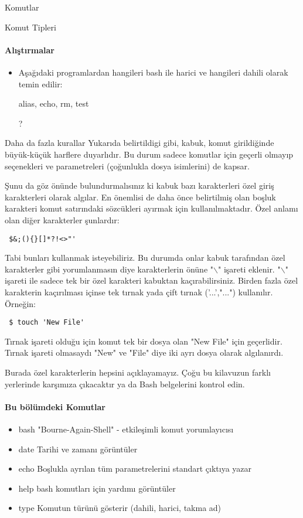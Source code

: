 \documentclass[10pt,a5paper]{book}
\begin{document}
\begin{section}{Komutlar}
\begin{subsection}{Komut Tipleri}
\paragraph{Alıştırmalar}{
\begin{itemize}
\item Aşağıdaki programlardan hangileri bash ile harici ve hangileri dahili olarak temin edilir: \begin{em}alias, echo, rm, test\end{em}?
\end{itemize}
}
\end{subsection}
\begin{subsection}{Daha da fazla kurallar}
Yukarıda belirtildigi gibi, kabuk, komut girildiğinde büyük-küçük harflere duyarlıdır. Bu durum sadece komutlar için geçerli olmayıp seçenekleri ve parametreleri (çoğunlukla dosya isimlerini) de kapsar.

Şunu da göz önünde bulundurmalısınız ki kabuk bazı karakterleri özel giriş karakterleri olarak algılar. En önemlisi de daha önce belirtilmiş olan
boşluk karakteri komut satırındaki sözcükleri ayırmak için kullanılmaktadır. Özel anlamı olan diğer karakterler şunlardır:

\begin{verbatim}
 $&;(){}[]*?!<>"'
\end{verbatim}

Tabi bunları kullanmak isteyebiliriz. Bu durumda onlar kabuk tarafından özel karakterler gibi yorumlanmasın diye karakterlerin önüne "$\backslash$" işareti eklenir. "$\backslash$" işareti ile sadece tek bir özel karakteri kabuktan kaçırabilirsiniz. Birden fazla özel karakterin kaçırılması içinse tek tırnak yada çift tırnak ('...',"...") kullanılır. Örneğin:

\begin{verbatim}
 $ touch 'New File'
\end{verbatim}

Tırnak işareti olduğu için komut tek bir dosya olan "New File" için geçerlidir. Tırnak işareti olmasaydı "New" ve "File" diye iki ayrı dosya olarak algılanırdı.

Burada özel karakterlerin hepsini açıklayamayız. Çoğu bu kilavuzun farklı yerlerinde karşımıza çıkacaktır ya da Bash belgelerini kontrol edin.

\paragraph{Bu bölümdeki Komutlar}{
\begin{itemize}
\item bash 	"Bourne-Again-Shell" - etkileşimli komut yorumlayıcısı
\item date 	Tarihi ve zamanı görüntüler
\item echo 	Boşlukla ayrılan tüm parametrelerini standart çıktıya yazar
\item help	bash komutları için yardımı görüntüler
\item type 	Komutun türünü gösterir (dahili, harici, takma ad)
\end{itemize}}

\end{subsection}
\end{section}
\end{document}
